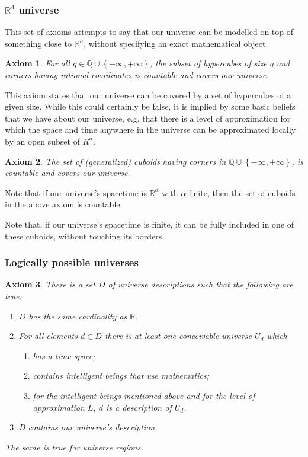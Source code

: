 \documentclass[a4paper
,draft
]{article}
\newcommand{\svn}[2][]{\todo[author=Virgil,color=red!25!white,#1]{#2}}
\def\reale{\mathbb{R}}
\def\rationale{\mathbb{Q}}
\newcommand{\multime}[1]{\left\{ #1 \right\}}
\newtheorem{axiom}{Axiom}
\begin{document}
\subsubsection{$\reale^4$ universe}

This set of axioms attempts to say that our universe can be modelled
on top of something close to $\reale^n$, without specifying an exact
mathematical object.

\begin{axiom}\label{unitycovering}
  For all $q\in\rationale\cup\multime{-\infty, +\infty}$,
  the subset of hypercubes of size $q$ and corners
  having rational coordinates is countable and covers our universe.
\end{axiom}
\svn{Do I Need this axiom?}

This axiom states that our universe can be covered by a set of hypercubes
of a given size. While this could certainly be false, it is implied by some
basic beliefs that we have about our universe, e.g. that there is a
level of approximation for which the space and time anywhere in the universe
can be approximated locally by an open subset of $R^n$.

\begin{axiom}\label{rationalcovering}
  The set of (generalized) cuboids having corners in
  $\rationale\cup\multime{-\infty, +\infty}$,
  is countable and covers our universe.
\end{axiom}

Note that if our universe's spacetime is $\reale^\alpha$ with
$\alpha$ finite, then the set of cuboids in the above axiom is countable.

Note that, if our universe's spacetime is finite, it can be fully included
in one of these cuboids, without touching its borders.

\subsubsection{Logically possible universes}

\begin{axiom}\label{uncountable}
  There is a set $D$ of universe descriptions such that the following are true:
  \begin{enumerate}
    \item $D$ has the same cardinality as $\reale$.
    \item For all elements $d\in D$ there is at least one conceivable
          universe $U_d$ which
      \begin{enumerate}
        \item has a time-space;
        \item contains intelligent beings that use mathematics;
        \item for the intelligent beings mentioned above and
              for the level of approximation $L$,
              $d$ is a description of $U_d$.
      \end{enumerate}
    \item D contains our universe's description.
  \end{enumerate}
  The same is true for universe regions.
\end{axiom}
\end{document}
